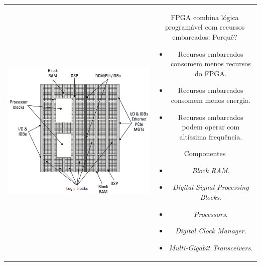 \documentclass[aspectratio=169]{beamer}
\begin{document}
	\begin{frame}%
		\begin{tabular}{cc}
			\begin{minipage}{0.5\textwidth}
				\includegraphics[height=0.9\textheight]{img/print/abstracao.png}
			\end{minipage}
			&
			\begin{minipage}{0.5\textwidth}
				\begin{block}{FPGA combina lógica programável com recursos embarcados. Porquê?}
					\begin{itemize}
						\setlength\itemsep{0em}
						\item Recursos embarcados consomem menos recursos do FPGA.
						\item Recursos embarcados consomem menos energia.
						\item Recursos embarcados podem operar com altíssima frequência.
					\end{itemize}
				\end{block}
				\begin{block}{Componentes}
					\begin{itemize}
						\setlength\itemsep{0em}
						\item \textit{Block RAM}.
						\item \textit{Digital Signal Processing Blocks}.
						\item \textit{Processors}.
						\item \textit{Digital Clock Manager}.
						\item \textit{Multi-Gigabit Transceivers}.
					\end{itemize}
				\end{block}
			\end{minipage}
		\end{tabular}
		

\end{frame}
\end{document}

